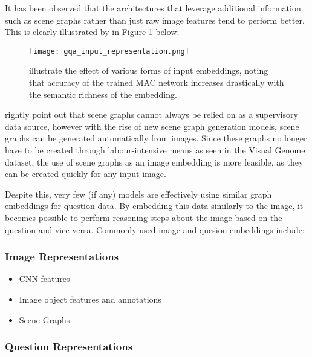It has been observed that the architectures that leverage additional information such as scene graphs rather than just raw image features tend to perform better. This is clearly illustrated by \citeauthor{hudson2019gqa_preprint} in Figure \ref{fig:gqa_input_representation} below:

\begin{figure}[H]
    \centering
    \texttt{[image: gqa\_input\_representation.png]}
    \caption{\citeauthor{hudson2019gqa_preprint} illustrate the effect of various forms of input embeddings, noting that accuracy of the trained MAC network \cite{hudson2018compositional} increases drastically with the semantic richness of the embedding.}
    \label{fig:gqa_input_representation}
\end{figure}

\citeauthor{hudson2018compositional} rightly point out that scene graphs cannot always be relied on as a supervisory data source, however with the rise of new scene graph generation models, scene graphs can be generated automatically from images. Since these graphs no longer have to be created through labour-intensive means as seen in the Visual Genome dataset, the use of scene graphs as an image embedding is more feasible, as they can be created quickly for any input image.

\vspace{\baselineskip}

Despite this, very few (if any) models are effectively using similar graph embeddings for question data. By embedding this data similarly to the image, it becomes possible to perform reasoning steps about the image based on the question and vice versa. Commonly used image and quesion embeddings include:

\subsubsection*{Image Representations}

\begin{itemize}
    \item CNN features
    \item Image object features and annotations
    \item Scene Graphs
\end{itemize}

\subsubsection*{Question Representations}

